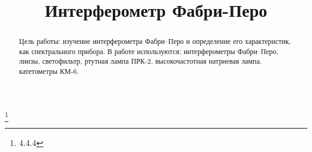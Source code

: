 


\title{Интерферометр Фабри-Перо}
\thanks{4.4.4}



\begin{abstract}
Цель работы: изучение интерферометра Фабри–Перо и определение его характеристик, как спектрального прибора.
В работе используются: интерферометры Фабри–Перо, линзы, светофильтр, ртутная лампа ПРК-2, высокочастотная натриевая лампа, катетометры КМ-6.

\end{abstract}


\maketitle

